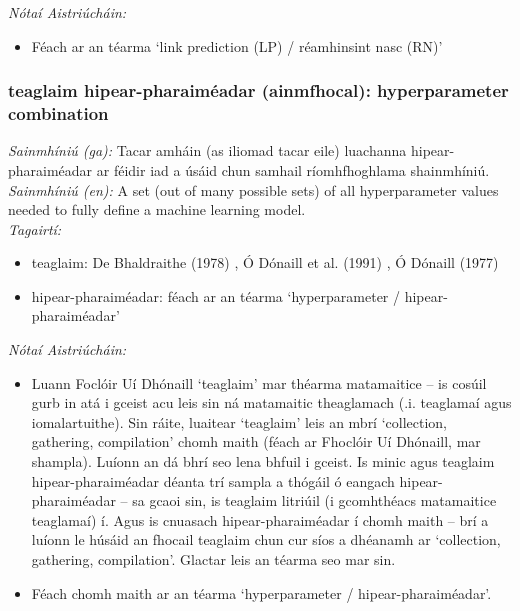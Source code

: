  \noindent \textit{Nótaí Aistriúcháin:}
\begin{itemize}
	\item Féach ar an téarma `link prediction (LP) / réamhinsint nasc (RN)'
\end{itemize}


\subsubsection*{teaglaim hipear-pharaiméadar (ainmfhocal): hyperparameter combination}
 \noindent \textit{Sainmhíniú (ga):} Tacar amháin (as iliomad tacar eile) luachanna hipear-pharaiméadar ar féidir iad a úsáid chun samhail ríomhfhoghlama shainmhíniú.
\\
 \noindent \textit{Sainmhíniú (en):} A set (out of many possible sets) of all hyperparameter values needed to fully define a machine learning model.
\\
 \noindent \textit{Tagairtí:}
\begin{itemize}
	\item teaglaim: De Bhaldraithe (1978) \cite{de-bhaldraithe}, Ó Dónaill et al. (1991) \cite{focloir-beag}, Ó Dónaill (1977) \cite{odonaill}
	\item hipear-pharaiméadar: féach ar an téarma `hyperparameter / hipear-pharaiméadar'
\end{itemize}

 \noindent \textit{Nótaí Aistriúcháin:}
\begin{itemize}
	\item Luann Foclóir Uí Dhónaill `teaglaim' mar théarma matamaitice -- is cosúil gurb in atá i gceist acu leis sin ná matamaitic theaglamach (.i. teaglamaí agus iomalartuithe). Sin ráite, luaitear `teaglaim' leis an mbrí `collection, gathering, compilation' chomh maith (féach ar Fhoclóir Uí Dhónaill, mar shampla). Luíonn an dá bhrí seo lena bhfuil i gceist. Is minic agus teaglaim hipear-pharaiméadar déanta trí sampla a thógáil ó eangach hipear-pharaiméadar -- sa gcaoi sin, is teaglaim litriúil (i gcomhthéacs matamaitice teaglamaí) í. Agus is cnuasach hipear-pharaiméadar í chomh maith -- brí a luíonn le húsáid an fhocail teaglaim chun cur síos a dhéanamh ar `collection, gathering, compilation'. Glactar leis an téarma seo mar sin.
	\item Féach chomh maith ar an téarma `hyperparameter / hipear-pharaiméadar'.
\end{itemize}


